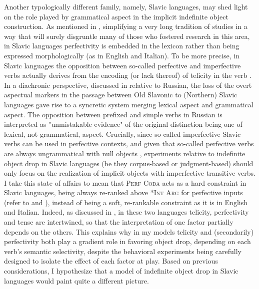 Another typologically different family, namely, Slavic languages, may shed light on the role played by grammatical aspect in the implicit indefinite object construction. As mentioned in , simplifying a very long tradition of studies in a way that will surely disgruntle many of those who fostered research in this area, in Slavic languages perfectivity is embedded in the lexicon rather than being expressed morphologically (as in English and Italian). To be more precise, in Slavic languages the opposition between so-called perfective and imperfective verbs actually derives from the encoding (or lack thereof) of telicity in the verb \parencite{bertinetto2012diachronic, bertinetto-delfitto2000aspect, bertinetto2001frequent}. In a diachronic perspective, discussed in \textcite{bertinetto2012diachronic} relative to Russian, the loss of the overt aspectual markers in the passage between Old Slavonic to (Northern) Slavic languages gave rise to a syncretic system merging lexical aspect and grammatical aspect. The opposition between prefixed and simple verbs in Russian is interpreted as "unmistakable evidence" of the original distinction being one of lexical, not grammatical, aspect. Crucially, since so-called imperfective Slavic verbs can be used in perfective contexts, and given that so-called perfective verbs are always ungrammatical with null objects \parencite{sopata2016null, TsimpliPapadopoulou2006}, experiments relative to indefinite object drop in Slavic languages (be they corpus-based or judgment-based) should only focus on the realization of implicit objects with imperfective transitive verbs. I take this state of affairs to mean that \textsc{Perf Coda} acts as a hard constraint in Slavic languages, being always re-ranked above \textsc{*Int Arg} for perfective inputs (refer to  and ), instead of being a soft, re-rankable constraint as it is in English and Italian. Indeed, as discussed in , in these two languages telicity, perfectivity and tense are intertwined, so that the interpretation of one factor partially depends on the others. This explains why in my models telicity and (secondarily) perfectivity both play a gradient role in favoring object drop, depending on each verb's semantic selectivity, despite the behavioral experiments being carefully designed to isolate the effect of each factor at play. Based on previous considerations, I hypothesize that a model of indefinite object drop in Slavic languages would paint quite a different picture.

